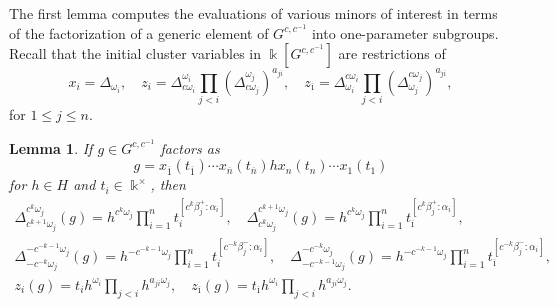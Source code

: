 \documentclass[12pt]{amsart}
\newcommand{\kk}{\Bbbk}
\newcommand{\ol}[1]{\overline{#1}}
\newcommand{\cvar}{z}
\newtheorem{lemma}[theorem]{Lemma}
\theoremstyle{remark}
\numberwithin{equation}{section}
\numberwithin{figure}{section}
\begin{document}
The first lemma computes the evaluations of various minors of interest in terms of the factorization of a generic element of $G^{c,c^{-1}}$ into one-parameter subgroups.
Recall that the initial cluster variables in $\kk[G^{c,c^{-1}}]$ are restrictions of
\[
  x_i = \Delta_{\omega_i},
  \quad
  \cvar_i = \Delta^{\omega_i}_{ c\omega_i} \prod_{j < i}(\Delta^{\omega_j}_{c \omega_j})^{a_{ji}},
  \quad
  \cvar_{\ol{\imath}} = \Delta^{c \omega_i}_{\omega_i} \prod_{j < i}(\Delta^{c \omega_j}_{\omega_j})^{a_{ji}},
\]
for $1 \leq j \leq n$.

\begin{lemma}
  \label{lemma:coefficients_values}
  If $g \in G^{c,c^{-1}}$ factors as
  \begin{equation}
    \label{eq:generic_factorization}
    g = x_{\ol{1}}(t_{\ol{1}}) \cdots x_{\ol{n}}(t_{\ol{n}}) h x_n(t_n) \cdots x_1(t_1)
  \end{equation}
  for $h \in H$ and $t_i \in \kk^\times$, then
  \begin{gather}
    \Delta^{c^k\omega_j}_{c^{k+1}\omega_j}(g) = h^{c^k\omega_j}\prod_{i=1}^n t_{i}^{[c^k\beta_j^+:\alpha_i]},
    \quad
    \Delta^{c^{k+1}\omega_j}_{c^k\omega_j}(g) = h^{c^k\omega_j}\prod_{i=1}^n t_{\ol{\imath}}^{[c^k\beta_j^+:\alpha_i]},
    \label{eq:positive_cminor_values}\\
    \Delta^{-c^{-k-1}\omega_j}_{-c^{-k}\omega_j}(g) = h^{-c^{-k-1}\omega_j}\prod_{i=1}^n t_{i}^{[c^{-k}\beta_j^-:\alpha_i]},
    \quad
    \Delta^{-c^{-k}\omega_j}_{-c^{-k-1}\omega_j}(g) = h^{-c^{-k-1}\omega_j}\prod_{i=1}^n t_{\ol{\imath}}^{[c^{-k}\beta_j^-:\alpha_i]},
    \label{eq:negative_cminor_values}\\
    \cvar_i(g) = t_i h^{\omega_i}\prod_{ j <i}h^{a_{ j  i}\omega_ j },
    \quad
    \cvar_{\ol{\imath}}(g) = t_{\ol{\imath}} h^{\omega_i}\prod_{ j <i}h^{a_{ j  i}\omega_ j }.
    \label{eq:frozen_values}
  \end{gather}
\end{lemma}
\end{document}
